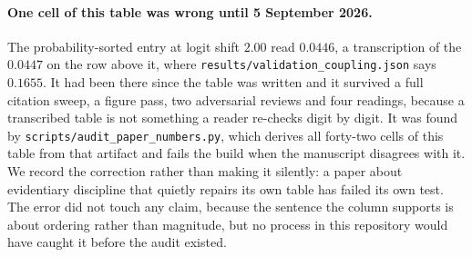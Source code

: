 \documentclass[11pt]{article}
\theoremstyle{remark}
\begin{document}
\paragraph{One cell of this table was wrong until 5 September 2026.} The
probability-sorted entry at logit shift $2.00$ read $0.0446$, a transcription of
the $0.0447$ on the row above it, where
\texttt{results/validation\_coupling.json} says $0.1655$. It had been there
since the table was written and it survived a full citation sweep, a figure pass,
two adversarial reviews and four readings, because a transcribed table is not
something a reader re-checks digit by digit. It was found by
\texttt{scripts/audit\_paper\_numbers.py}, which derives all forty-two cells of
this table from that artifact and fails the build when the manuscript disagrees
with it. We record the correction rather than making it silently: a paper about
evidentiary discipline that quietly repairs its own table has failed its own
test. The error did not touch any claim, because the sentence the column supports
is about ordering rather than magnitude, but no process in this repository would
have caught it before the audit existed.
\end{document}
